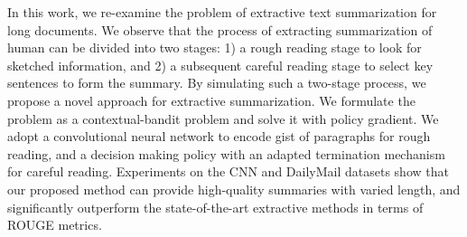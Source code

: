 In this work, we re-examine the problem of extractive text summarization for long documents.
We observe that the process of extracting summarization of human can be divided into two stages: 1) a rough reading stage to look for sketched information, and 2) a subsequent careful reading stage to select key sentences to form the summary.
By simulating such a two-stage process, we propose a novel approach for extractive summarization. We formulate the problem as a contextual-bandit problem and solve it with policy gradient. We adopt a convolutional neural network to encode gist of paragraphs for rough reading, and a decision making policy with an adapted termination mechanism for careful reading.
Experiments on the CNN and DailyMail datasets show that our proposed method can provide high-quality summaries with varied length, and significantly outperform the state-of-the-art extractive methods in terms of ROUGE metrics.